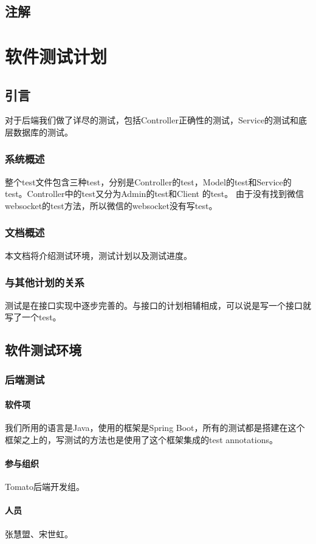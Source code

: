 \documentclass{article}
\begin{document}
\subsection{注解}

\section{软件测试计划}
\label{软件测试计划}
\subsection{引言}
对于后端我们做了详尽的测试，包括Controller正确性的测试，Service的测试和底层数据库的测试。
\subsubsection{系统概述}
整个test文件包含三种test，分别是Controller的test，Model的test和Service的test。Controller中的test又分为Admin的test和Client 的test。 由于没有找到微信websocket的test方法，所以微信的websocket没有写test。
\subsubsection{文档概述}
本文档将介绍测试环境，测试计划以及测试进度。
\subsubsection{与其他计划的关系}
测试是在接口实现中逐步完善的。与接口的计划相辅相成，可以说是写一个接口就写了一个test。
\subsection{软件测试环境}
\subsubsection{后端测试}
\paragraph{软件项}
	我们所用的语言是Java，使用的框架是Spring Boot，所有的测试都是搭建在这个框架之上的，写测试的方法也是使用了这个框架集成的test annotations。
\paragraph{参与组织}
	Tomato后端开发组。
\paragraph{人员}
	张慧盟、宋世虹。
\end{document}
